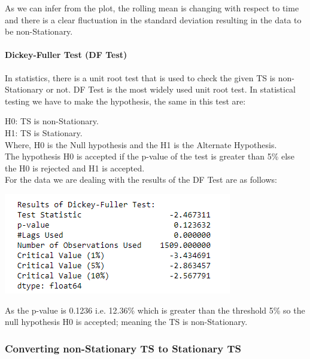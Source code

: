 			As we can infer from the plot, the rolling mean is changing with respect to time and there is a clear fluctuation in the standard deviation resulting in the data to be non-Stationary.

		\paragraph{Dickey-Fuller Test (DF Test)}

		In statistics, there is a unit root test that is used to check the given TS is non-Stationary or not. DF Test \cite{18} is the most widely used unit root test. In statistical testing we have to make the hypothesis, the same in this test are:

H0:	TS is non-Stationary.\\
H1:	TS is Stationary.\\

Where, H0 is the Null hypothesis and the H1 is the Alternate Hypothesis.\\ 
The hypothesis H0 is accepted if the p-value of the test is greater than 5\% else the H0 is rejected and H1 is accepted.\\

For the data we are dealing with the results of the DF Test are as follows:

		\begin{center}
		\includegraphics[width=\linewidth]{figures/DF-Test-Results-for-moving-average-of-Closing-price.jpg}	
		\label{fig: DF Test Results for moving average of Closing price}
		\end{center}
	
		As the p-value is 0.1236 i.e. 12.36\% which is greater than the threshold 5\% so the null hypothesis H0 is accepted; meaning the TS is non-Stationary.

	\subsubsection{Converting non-Stationary TS to Stationary TS}
	
